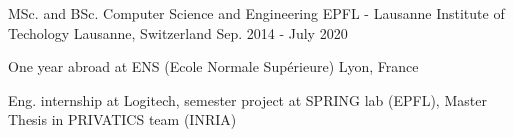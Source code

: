 


\begin{cventries}
	
	\cventry
	{MSc. and BSc. Computer Science and Engineering} %
	{EPFL - Lausanne Institute of Techology} %
	{Lausanne, Switzerland} %
	{Sep. 2014 - July 2020} %
	{ %
		\begin{cvitems}
			\item {One year abroad at ENS (Ecole Normale Supérieure) Lyon, France}
			\item {Eng. internship at Logitech, semester project at SPRING lab (EPFL), Master Thesis in PRIVATICS team (INRIA)}
		\end{cvitems}
	}
	
	
	
	
\end{cventries}